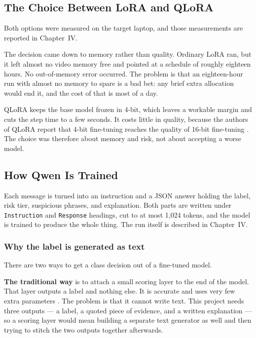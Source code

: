 \subsection{The Choice Between LoRA and QLoRA}
Both options were measured on the target laptop, and those measurements are reported in Chapter~IV.

The decision came down to memory rather than quality. Ordinary LoRA ran, but it left almost no video memory free and pointed at a schedule of roughly eighteen hours. No out-of-memory error occurred. The problem is that an eighteen-hour run with almost no memory to spare is a bad bet: any brief extra allocation would end it, and the cost of that is most of a day.

QLoRA keeps the base model frozen in 4-bit, which leaves a workable margin and cuts the step time to a few seconds. It costs little in quality, because the authors of QLoRA report that 4-bit fine-tuning reaches the quality of 16-bit fine-tuning \cite{dettmers2023qlora}. The choice was therefore about memory and risk, not about accepting a worse model.

\subsection{How Qwen Is Trained}
Each message is turned into an instruction and a JSON answer holding the label, risk tier, suspicious phrases, and explanation. Both parts are written under \texttt{Instruction} and \texttt{Response} headings, cut to at most 1{,}024 tokens, and the model is trained to produce the whole thing. The run itself is described in Chapter~IV.

\subsubsection*{Why the label is generated as text}

There are two ways to get a class decision out of a fine-tuned model.

\textbf{The traditional way} is to attach a small scoring layer to the end of the model. That layer outputs a label and nothing else. It is accurate and uses very few extra parameters \cite{yousefiramandi2025finetuning}. The problem is that it cannot write text. This project needs three outputs --- a label, a quoted piece of evidence, and a written explanation --- so a scoring layer would mean building a separate text generator as well and then trying to stitch the two outputs together afterwards.

